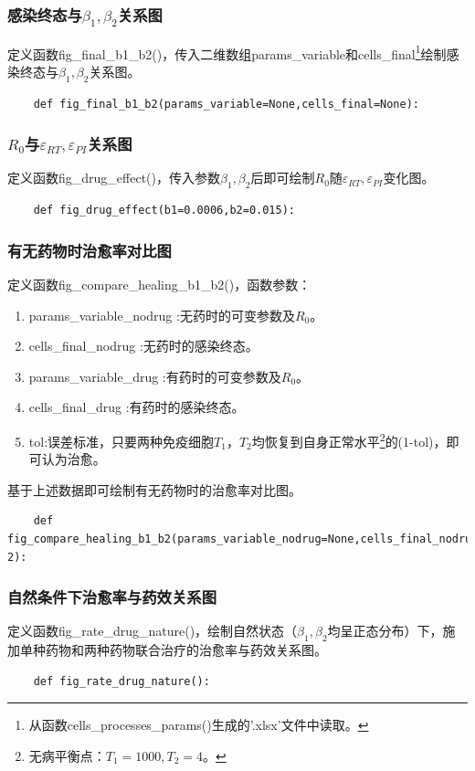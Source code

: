 \documentclass{ctexart}
\begin{document}
\subsubsection{感染终态与$\beta_{1},\beta_{2}$关系图}
定义函数fig\_final\_b1\_b2()，传入二维数组params\_variable和cells\_final\footnote{从函数cells\_processes\_params()生成的'.xlsx'文件中读取。}绘制感染终态与$\beta_{1},\beta_{2}$关系图。
\begin{lstlisting}
    def fig_final_b1_b2(params_variable=None,cells_final=None):
\end{lstlisting}

\subsubsection{$R_{0}$与$\varepsilon _{RT},\varepsilon _{PI}$关系图}
定义函数fig\_drug\_effect()，传入参数$\beta_{1},\beta_{2}$后即可绘制$R_{0}$随$\varepsilon _{RT},\varepsilon _{PI}$变化图。
\begin{lstlisting}
    def fig_drug_effect(b1=0.0006,b2=0.015):
\end{lstlisting}

\subsubsection{有无药物时治愈率对比图}
定义函数fig\_compare\_healing\_b1\_b2()，函数参数：
\begin{enumerate}
    \item params\_variable\_nodrug :无药时的可变参数及$R_{0}$。
    \item cells\_final\_nodrug :无药时的感染终态。
    \item params\_variable\_drug :有药时的可变参数及$R_{0}$。
    \item cells\_final\_drug :有药时的感染终态。
    \item tol:误差标准，只要两种免疫细胞$T_{1}，T_{2}$均恢复到自身正常水平\footnote{无病平衡点：$T_{1}=1000,T_{2}=4$。}的(1-tol)，即可认为治愈。
\end{enumerate}
基于上述数据即可绘制有无药物时的治愈率对比图。
\begin{lstlisting}
    def fig_compare_healing_b1_b2(params_variable_nodrug=None,cells_final_nodrug=None,params_variable_drug=None,cells_final_drug=None,tol=1e-2):
\end{lstlisting}

\subsubsection{自然条件下治愈率与药效关系图}
定义函数fig\_rate\_drug\_nature()，绘制自然状态（$\beta_{1},\beta_{2}$均呈正态分布）下，施加单种药物和两种药物联合治疗的治愈率与药效关系图。
\begin{lstlisting}
    def fig_rate_drug_nature():
\end{lstlisting}
\end{document}
